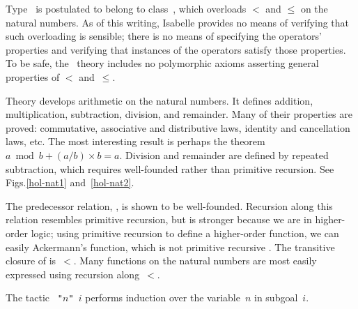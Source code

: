 Type~ is postulated to belong to class~, which
overloads $<$ and $\leq$ on the natural numbers.  As of this writing,
Isabelle provides no means of verifying that such overloading is sensible;
there is no means of specifying the operators' properties and verifying
that instances of the operators satisfy those properties.  To be safe, the
\HOL\ theory includes no polymorphic axioms asserting general properties of
$<$ and~$\leq$.

Theory  develops arithmetic on the natural numbers.  It
defines addition, multiplication, subtraction, division, and remainder.
Many of their properties are proved: commutative, associative and
distributive laws, identity and cancellation laws, etc.  The most
interesting result is perhaps the theorem $a \bmod b + (a/b)\times b = a$.
Division and remainder are defined by repeated subtraction, which requires
well-founded rather than primitive recursion.  See Figs.\ts\ref{hol-nat1}
and~\ref{hol-nat2}.

The predecessor relation, , is shown to be well-founded.
Recursion along this relation resembles primitive recursion, but is
stronger because we are in higher-order logic; using primitive recursion to
define a higher-order function, we can easily Ackermann's function, which
is not primitive recursive \cite[page~104]{thompson91}.
The transitive closure of  is~$<$.  Many functions on the
natural numbers are most easily expressed using recursion along~$<$.

The tactic {\tt{} "$n$" $i$} performs induction over the
variable~$n$ in subgoal~$i$.

